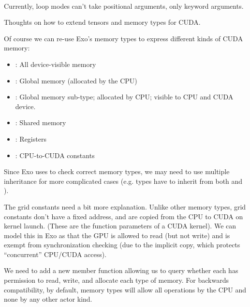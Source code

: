 \filbreak
{}\\

\filbreak
Currently, loop modes can't take positional arguments, only keyword arguments.


\filbreak
{}

Thoughts on how to extend tensors and memory types for CUDA.

 Of course we can re-use Exo's memory types to express different kinds of CUDA memory:
\begin{itemize}
  \filbreak
  \item {}: All device-visible memory
  \filbreak
  \item {}: Global memory (allocated by the CPU)
  \filbreak
  \item {}: Global memory sub-type; allocated by CPU; visible to CPU and CUDA device.
  \filbreak
  \item {}: Shared memory
  \filbreak
  \item {}: Registers
  \filbreak
  \item {}: CPU-to-CUDA constants
\end{itemize}

\filbreak
Since Exo uses  to check correct memory types, we may need to use multiple inheritance for more complicated cases (e.g.  types have to inherit from both  and ).

\filbreak
The grid constants need a bit more explanation.
Unlike other memory types, grid constants don't have a fixed address, and are copied from the CPU to CUDA on kernel launch.
(These are the function parameters of a CUDA kernel).
We can model this in Exo as  that the GPU is allowed to read (but not write) and is exempt from synchronization checking (due to the implicit copy, which protects ``concurrent'' CPU/CUDA access).

\filbreak
{} We need to add a new member function allowing us to query whether each  has permission to read, write, and allocate each type of memory.
For backwards compatibility, by default, memory types will allow all operations by the CPU and none by any other actor kind.

